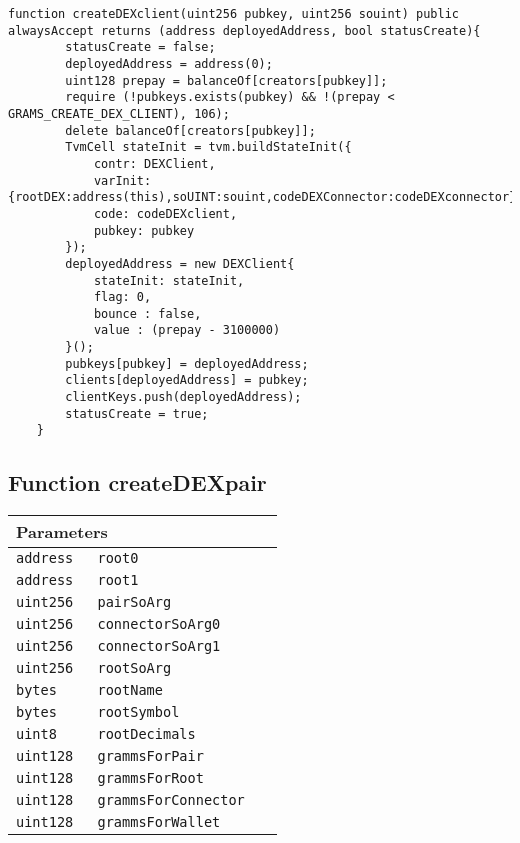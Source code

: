 \vspace{2cm}

\begin{lstlisting}[firstnumber=122]
	function createDEXclient(uint256 pubkey, uint256 souint) public alwaysAccept returns (address deployedAddress, bool statusCreate){
		statusCreate = false;
		deployedAddress = address(0);
		uint128 prepay = balanceOf[creators[pubkey]];
		require (!pubkeys.exists(pubkey) && !(prepay < GRAMS_CREATE_DEX_CLIENT), 106);
		delete balanceOf[creators[pubkey]];
		TvmCell stateInit = tvm.buildStateInit({
			contr: DEXClient,
			varInit: {rootDEX:address(this),soUINT:souint,codeDEXConnector:codeDEXconnector},
			code: codeDEXclient,
			pubkey: pubkey
		});
		deployedAddress = new DEXClient{
			stateInit: stateInit,
			flag: 0,
			bounce : false,
			value : (prepay - 3100000)
		}();
		pubkeys[pubkey] = deployedAddress;
		clients[deployedAddress] = pubkey;
		clientKeys.push(deployedAddress);
		statusCreate = true;
	}
\end{lstlisting}

\subsection{Function createDEXpair}


\ifsoltables
\noindent\begin{tabular}{|l|l|p{5cm}|}\hline
\multicolumn{3}{|l|}{\bf Parameters}\\\hline
\tt address & \tt root0 &\\\hline
\tt address & \tt root1 &\\\hline
\tt uint256 & \tt pairSoArg &\\\hline
\tt uint256 & \tt connectorSoArg0 &\\\hline
\tt uint256 & \tt connectorSoArg1 &\\\hline
\tt uint256 & \tt rootSoArg &\\\hline
\tt bytes & \tt rootName &\\\hline
\tt bytes & \tt rootSymbol &\\\hline
\tt uint8 & \tt rootDecimals &\\\hline
\tt uint128 & \tt grammsForPair &\\\hline
\tt uint128 & \tt grammsForRoot &\\\hline
\tt uint128 & \tt grammsForConnector &\\\hline
\tt uint128 & \tt grammsForWallet &\\\hline
\end{tabular}
\fi

